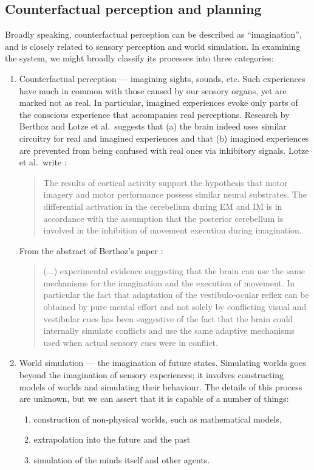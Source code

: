 \documentclass[]{scrartcl}
\theoremstyle{break}
\begin{document}
\subsection{Counterfactual perception and planning}\label{sec:worldSimulation}

Broadly speaking, counterfactual perception can be described as ``imagination'', and is closely related to sensory perception and world simulation. In examining the system, we might broadly classify its processes into three categories:

\begin{enumerate}
	\item Counterfactual perception --- imagining sights, sounds, etc. Such experiences have much in common with those caused by our sensory organs, yet are marked not as real. In particular, imagined experiences evoke only parts of the conscious experience that accompanies real perceptions. Research by Berthoz and Lotze et al.\ suggests that (a) the brain indeed uses similar circuitry for real and imagined experiences and that (b) imagined experiences are prevented from being confused with real ones via inhibitory signals. Lotze et al.\ write \cite{lotze1999}:
	\begin{quote}
		The results of cortical activity support the hypothesis that motor imagery and motor performance possess similar neural substrates. The differential activation in the cerebellum during EM and IM is in accordance with the assumption that the posterior cerebellum is involved in the inhibition of movement execution during imagination.
	\end{quote}
	
	From the abstract of Berthoz's paper \cite{8713551}:
	
	\begin{quotation}
		(...) experimental evidence suggesting that the brain can use the same mechanisms for the imagination and the execution of movement. In particular the fact that adaptation of the vestibulo-ocular reflex can be obtained by pure mental effort and not solely by conflicting visual and vestibular cues has been suggestive of the fact that the brain could internally simulate conflicts and use the same adaptive mechanisms used when actual sensory cues were in conflict.
	\end{quotation}
	
	\item World simulation --- the imagination of future states. Simulating worlds goes beyond the imagination of sensory experiences; it involves constructing models of worlds and simulating their behaviour. The details of this process are unknown, but we can assert that it is capable of a number of things:
	\begin{enumerate}
		\item construction of non-physical worlds, such as mathematical models,
		\item extrapolation into the future and the past
		\item simulation of the minds itself and other agents.
	\end{enumerate}
	

\end{enumerate}
\end{document}
